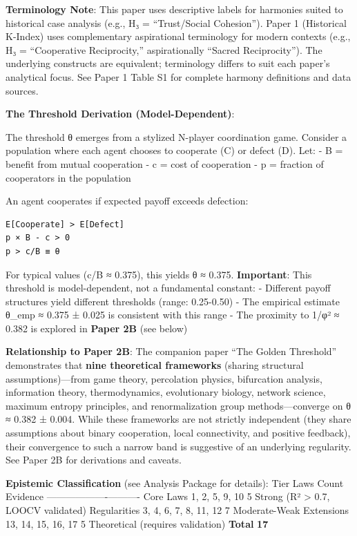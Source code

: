 \documentclass[11pt,letterpaper]{article}
\begin{document}
\textbf{Terminology Note}: This paper uses descriptive labels for
harmonies suited to historical case analysis (e.g., H₃ = ``Trust/Social
Cohesion''). Paper 1 (Historical K-Index) uses complementary
aspirational terminology for modern contexts (e.g., H₃ = ``Cooperative
Reciprocity,'' aspirationally ``Sacred Reciprocity''). The underlying
constructs are equivalent; terminology differs to suit each paper's
analytical focus. See Paper 1 Table S1 for complete harmony definitions
and data sources.

\textbf{The Threshold Derivation (Model-Dependent)}:

The threshold θ emerges from a stylized N-player coordination game.
Consider a population where each agent chooses to cooperate (C) or
defect (D). Let: - B = benefit from mutual cooperation - c = cost of
cooperation - p = fraction of cooperators in the population

An agent cooperates if expected payoff exceeds defection:

\begin{verbatim}
E[Cooperate] > E[Defect]
p × B - c > 0
p > c/B ≡ θ
\end{verbatim}

For typical values (c/B ≈ 0.375), this yields θ ≈ 0.375.
\textbf{Important}: This threshold is model-dependent, not a fundamental
constant: - Different payoff structures yield different thresholds
(range: 0.25-0.50) - The empirical estimate θ\_emp ≈ 0.375 ± 0.025 is
consistent with this range - The proximity to 1/φ² ≈ 0.382 is explored
in \textbf{Paper 2B} (see below)

\textbf{Relationship to Paper 2B}: The companion paper ``The Golden
Threshold'' demonstrates that \textbf{nine theoretical frameworks}
(sharing structural assumptions)---from game theory, percolation
physics, bifurcation analysis, information theory, thermodynamics,
evolutionary biology, network science, maximum entropy principles, and
renormalization group methods---converge on θ ≈ 0.382 ± 0.004. While
these frameworks are not strictly independent (they share assumptions
about binary cooperation, local connectivity, and positive feedback),
their convergence to such a narrow band is suggestive of an underlying
regularity. See Paper 2B for derivations and caveats.

\textbf{Epistemic Classification} (see Analysis Package for details):
\textbar{} Tier \textbar{} Laws \textbar{} Count \textbar{} Evidence
\textbar{}
\textbar------\textbar------\textbar-------\textbar----------\textbar{}
\textbar{} Core Laws \textbar{} 1, 2, 5, 9, 10 \textbar{} 5 \textbar{}
Strong (R² \textgreater{} 0.7, LOOCV validated) \textbar{} \textbar{}
Regularities \textbar{} 3, 4, 6, 7, 8, 11, 12 \textbar{} 7 \textbar{}
Moderate-Weak \textbar{} \textbar{} Extensions \textbar{} 13, 14, 15,
16, 17 \textbar{} 5 \textbar{} Theoretical (requires validation)
\textbar{} \textbar{} \textbf{Total} \textbar{} \textbar{} \textbf{17}
\textbar{} \textbar{}
\end{document}

